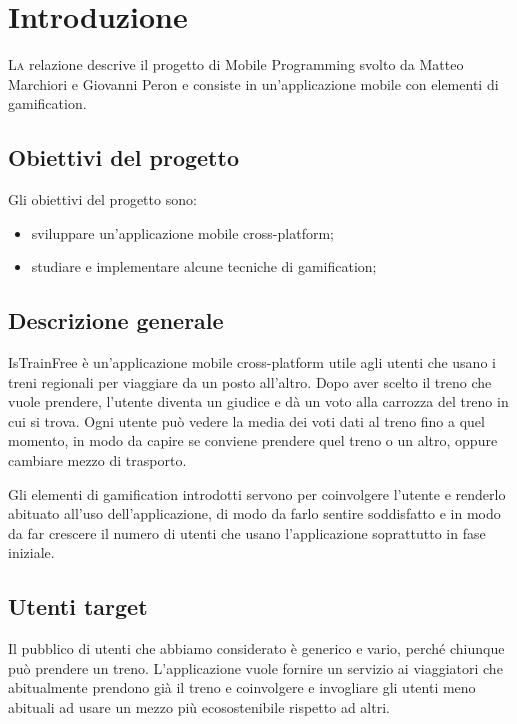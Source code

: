 \chapter{Introduzione\label{sec:introduzione}}
\lettrine[findent=1.5em]{L}a relazione descrive il progetto di Mobile Programming svolto da Matteo Marchiori e Giovanni Peron e consiste in un'applicazione mobile con elementi di gamification.

\section{Obiettivi del progetto\label{sec:obiettivi}}
Gli obiettivi del progetto sono:
\begin{itemize}
    \item sviluppare un'applicazione mobile cross-platform;
    \item studiare e implementare alcune tecniche di gamification;
\end{itemize}

\section{Descrizione generale\label{sec:descrizione}}
IsTrainFree è un'applicazione mobile cross-platform utile agli utenti che usano i treni regionali per viaggiare da un posto all'altro. Dopo aver scelto il treno che vuole prendere, l'utente diventa un giudice e dà un voto alla carrozza del treno in cui si trova. Ogni utente può vedere la media dei voti dati al treno fino a quel momento, in modo da capire se conviene prendere quel treno o un altro, oppure cambiare mezzo di trasporto.

Gli elementi di gamification introdotti servono per coinvolgere l'utente e renderlo abituato all'uso dell'applicazione, di modo da farlo sentire soddisfatto e in modo da far crescere il numero di utenti che usano l'applicazione soprattutto in fase iniziale.

\section{Utenti target}
Il pubblico di utenti che abbiamo considerato è generico e vario, perché chiunque può prendere un treno.
L'applicazione vuole fornire un servizio ai viaggiatori che abitualmente prendono già il treno e coinvolgere e invogliare gli utenti meno abituali ad usare un mezzo più ecosostenibile rispetto ad altri.